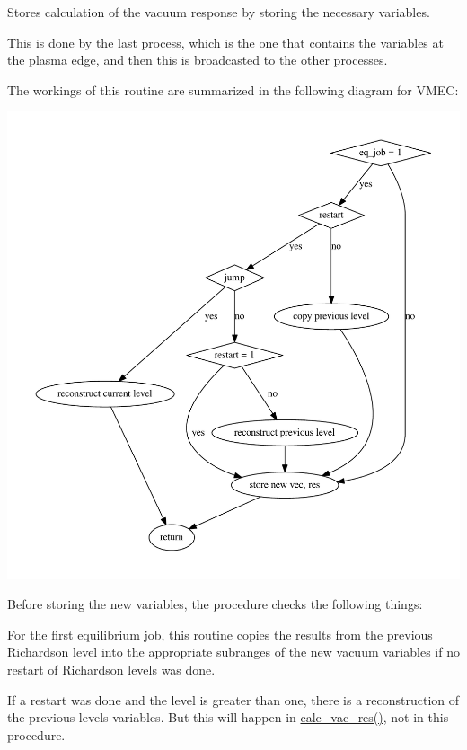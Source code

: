 Stores calculation of the vacuum response by storing the necessary variables. 

This is done by the last process, which is the one that contains the variables at the plasma edge, and then this is broadcasted to the other processes.

The workings of this routine are summarized in the following diagram for V\+M\+EC\+: 
\begin{DoxyImageNoCaption}
  \mbox{\includegraphics[width=\textwidth,height=\textheight/2,keepaspectratio=true]{dot_inline_dotgraph_1}}
\end{DoxyImageNoCaption}


Before storing the new variables, the procedure checks the following things\+:
\begin{DoxyItemize}
\item For the first equilibrium job, this routine copies the results from the previous Richardson level into the appropriate subranges of the new vacuum variables if no restart of Richardson levels was done.
\item If a restart was done and the level is greater than one, there is a reconstruction of the previous level\textquotesingle{}s variables. But this will happen in \hyperlink{namespacevac__ops_a5e5a8322b3aa2e3704b1050426f06d9d}{calc\+\_\+vac\+\_\+res()}, not in this procedure.
\end{DoxyItemize}

